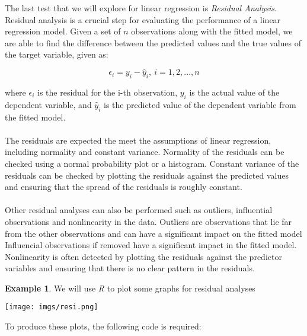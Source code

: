 \documentclass{article}[12pt]
\theoremstyle{definition}
\newtheorem{exmp}{Example}[section]
\begin{document}
\bigskip

The last test that we will explore for linear regression is \emph{Residual Analysis}.  Residual analysis is a crucial step for evaluating the performance of a linear regression model. Given a set of $n$ observations along with the fitted model, we are able to find the difference between the predicted values and the true values of the target variable, given as:

\medskip

$$\epsilon_i = y_i - \hat{y}_i, \  i = 1, 2, ..., n$$

\medskip

\noindent
where $\epsilon_i$ is the residual for the i-th observation, $y_i$ is the actual value of the dependent variable, and $\hat{y}_i$ is the predicted value of the dependent variable from the fitted model.
\\
\\
The residuals are expected the meet the assumptions of linear regression, including normality and constant variance. Normality of the residuals can be checked using a normal probability plot or a histogram. Constant variance of the residuals can be checked by plotting the residuals against the predicted values and ensuring that the spread of the residuals is roughly constant.
\\
\\
\noindent
Other residual analyses can also be performed such as outliers, influential observations and nonlinearity in the data. Outliers are observations that lie far from the other observations and can have a significant impact on the fitted model Influencial observations if removed have a significant impact in the fitted model. Nonlinearity is often detected by plotting the residuals against the predictor variables and ensuring that there is no clear pattern in the residuals.

\begin{exmp}
We will use \emph{R} to plot some graphs for residual analyses 
\end{exmp}

\begin{center}
    \texttt{[image: imgs/resi.png]}
\end{center}

\newpage

\bigskip 

\noindent
To produce these plots, the following code is required:

\medskip
\end{document}

